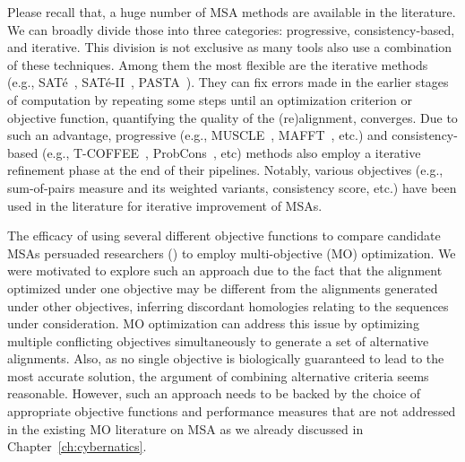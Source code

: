 Please recall that, a huge number of MSA methods are available in the literature. We can broadly divide those into three categories: progressive, consistency-based, and iterative. This division is not exclusive as many tools also use a combination of these techniques. Among them the most flexible are the iterative methods (e.g., SAT\'e~\cite{liu2009rapid}, SAT\'e-II~\cite{liu2012sate}, PASTA~\cite{mirarab2015pasta}). They can fix errors made in the earlier stages of computation by repeating some steps until an optimization criterion or objective function, quantifying the quality of the (re)alignment, converges. Due to such an advantage, progressive (e.g., MUSCLE~\cite{edgar2004muscle}, MAFFT~\cite{katoh2002mafft}, etc.) and consistency-based (e.g., T-COFFEE~\cite{notredame2000t}, ProbCons~\cite{do2005probcons}, etc) methods also employ a iterative refinement phase at the end of their pipelines. Notably, various objectives (e.g., sum-of-pairs measure and its weighted variants, consistency score, etc.) have been used in the literature for iterative improvement of MSAs. 

The efficacy of using several different objective functions to compare candidate MSAs persuaded researchers (\cite{da2010alineaga, ortuno2013optimizing, soto2014multi, abbasi2015local, rubio2016hybrid, zambrano2017comparing, rubio2018characteristic, benitez2020sequoya}) to employ multi-objective (MO) optimization. We were motivated to explore such an approach due to the fact that the alignment optimized under one objective may be different from the alignments generated under other objectives, inferring discordant homologies relating to the sequences under consideration. MO optimization can address this issue by optimizing multiple conflicting objectives simultaneously to
generate a set of alternative alignments. Also, as no single objective is biologically guaranteed to lead to the most accurate solution, the argument of combining alternative criteria seems reasonable. However, such an approach needs to be backed by the choice of appropriate objective functions and performance measures that are not addressed in the existing MO literature on MSA as we already discussed in Chapter~\ref{ch:cybernatics}.  



